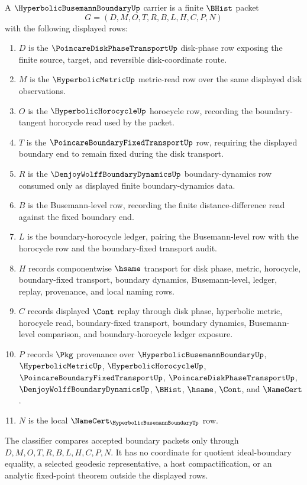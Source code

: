 \begin{definition}
\label{def:hyperbolic-busemann-boundary-carrier}
A $\HyperbolicBusemannBoundaryUp$ carrier is a finite $\BHist$ packet
$$
G=(D,M,O,T,R,B,L,H,C,P,N)
$$
with the following displayed rows:
\begin{enumerate}
\item $D$ is the $\PoincareDiskPhaseTransportUp$ disk-phase row exposing the finite source, target, and reversible disk-coordinate route.
\item $M$ is the $\HyperbolicMetricUp$ metric-read row over the same displayed disk observations.
\item $O$ is the $\HyperbolicHorocycleUp$ horocycle row, recording the boundary-tangent horocycle read used by the packet.
\item $T$ is the $\PoincareBoundaryFixedTransportUp$ row, requiring the displayed boundary end to remain fixed during the disk transport.
\item $R$ is the $\DenjoyWolffBoundaryDynamicsUp$ boundary-dynamics row consumed only as displayed finite boundary-dynamics data.
\item $B$ is the Busemann-level row, recording the finite distance-difference read against the fixed boundary end.
\item $L$ is the boundary-horocycle ledger, pairing the Busemann-level row with the horocycle row and the boundary-fixed transport audit.
\item $H$ records componentwise $\hsame$ transport for disk phase, metric, horocycle, boundary-fixed transport, boundary dynamics, Busemann-level, ledger, replay, provenance, and local naming rows.
\item $C$ records displayed $\Cont$ replay through disk phase, hyperbolic metric, horocycle read, boundary-fixed transport, boundary dynamics, Busemann-level comparison, and boundary-horocycle ledger exposure.
\item $P$ records $\Pkg$ provenance over $\HyperbolicBusemannBoundaryUp$, $\HyperbolicMetricUp$, $\HyperbolicHorocycleUp$, $\PoincareBoundaryFixedTransportUp$, $\PoincareDiskPhaseTransportUp$, $\DenjoyWolffBoundaryDynamicsUp$, $\BHist$, $\hsame$, $\Cont$, and $\NameCert$.
\item $N$ is the local $\NameCert_{\HyperbolicBusemannBoundaryUp}$ row.
\end{enumerate}
The classifier compares accepted boundary packets only through $D,M,O,T,R,B,L,H,C,P,N$. It has no coordinate for quotient ideal-boundary equality, a selected geodesic representative, a host compactification, or an analytic fixed-point theorem outside the displayed rows.
\end{definition}


